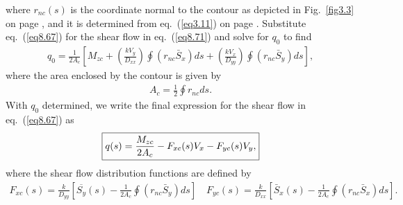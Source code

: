 \documentclass{AeroStructure-ERJohnson}
\begin{document}
where $r_{n c}(s)$ is the coordinate normal to the contour as
depicted in Fig.~\ref{fig3.3} on page \pageref{fig3.3}, and it is
determined from eq.~(\ref{eq3.11}) on page \pageref{eq3.11}.
Substitute eq.~(\ref{eq8.67}) for the shear flow in
eq.~(\ref{eq8.71}) and solve for $q_0$ to find
\begin{align}\label{eq8.72}
q_{0}=\frac{1}{2 A_{c}}\left[M_{z c}+\left(\frac{k V_{y}}{D_{x
x}}\right) \oint\left(r_{n c} \bar{S}_{x}\right) d s+\left(\frac{k
V_{x}}{D_{y y}}\right) \oint\left(r_{n c} \bar{S}_{y}\right) d
s\right],
\end{align}
where the area enclosed by the contour is given by
\begin{align}\label{eq8.73}
A_{c}=\frac{1}{2} \oint r_{n c} d s.
\end{align}
With $q_0$ determined, we write the final expression for the shear
flow in eq.~(\ref{eq8.67}) as
\begin{align}\label{eq8.74}
\fbox{$\displaystyle q(s)=\frac{M_{z c}}{2 A_{c}}-F_{x c}(s)
V_{x}-F_{y c}(s) V_{y},$}
\end{align}
where the shear flow distribution functions are defined by
\begin{align}\label{eq8.75}
F_{x c}(s)=\frac{k}{D_{y y}}\left[\overline{S_{y}}(s)-\frac{1}{2
A_{c}} \oint\left(r_{n c} \bar{S}_{y}\right) d s\right] \quad F_{y
c}(s)=\frac{k}{D_{x x}}\left[\bar{S}_{x}(s)-\frac{1}{2 A_{c}}
\oint\left(r_{n c} \bar{S}_{x}\right) d s\right].
\end{align}

\removelastskip
\end{document}
